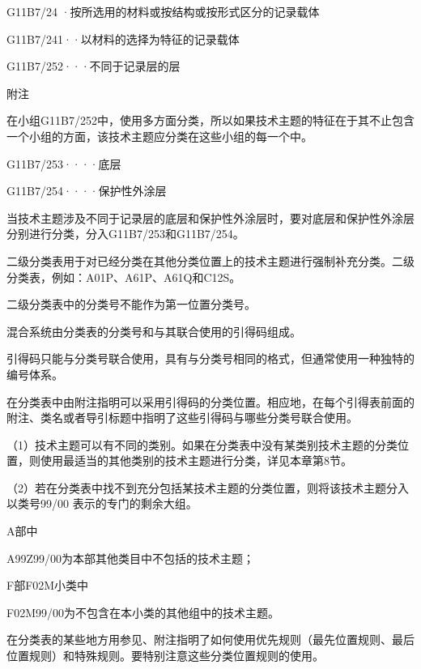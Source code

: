 G11B7/24 ·按所选用的材料或按结构或按形式区分的记录载体

G11B7/241··以材料的选择为特征的记录载体

G11B7/252···不同于记录层的层

附注

在小组G11B7/252中，使用多方面分类，所以如果技术主题的特征在于其不止包含一个小组的方面，该技术主题应分类在这些小组的每一个中。

G11B7/253····底层

G11B7/254····保护性外涂层

当技术主题涉及不同于记录层的底层和保护性外涂层时，要对底层和保护性外涂层分别进行分类，分入G11B7/253和G11B7/254。

二级分类表用于对已经分类在其他分类位置上的技术主题进行强制补充分类。二级分类表，例如：A01P、A61P、A61Q和C12S。

二级分类表中的分类号不能作为第一位置分类号。

混合系统由分类表的分类号和与其联合使用的引得码组成。

引得码只能与分类号联合使用，具有与分类号相同的格式，但通常使用一种独特的编号体系。

在分类表中由附注指明可以采用引得码的分类位置。相应地，在每个引得表前面的附注、类名或者导引标题中指明了这些引得码与哪些分类号联合使用。

{\setlength{\parindent}{17.1bp}（1）技术主题可以有不同的类别。如果在分类表中没有某类别技术主题的分类位置，则使用最适当的其他类别的技术主题进行分类，详见本章第8节。\par}

{\setlength{\parindent}{17.1bp}（2）若在分类表中找不到充分包括某技术主题的分类位置，则将该技术主题分入以类号99/00 表示的专门的剩余大组。\par}

{\par}

A部中

A99Z99/00为本部其他类目中不包括的技术主题；

F部F02M小类中

F02M99/00为不包含在本小类的其他组中的技术主题。

在分类表的某些地方用参见、附注指明了如何使用优先规则（最先位置规则、最后位置规则）和特殊规则。要特别注意这些分类位置规则的使用。

